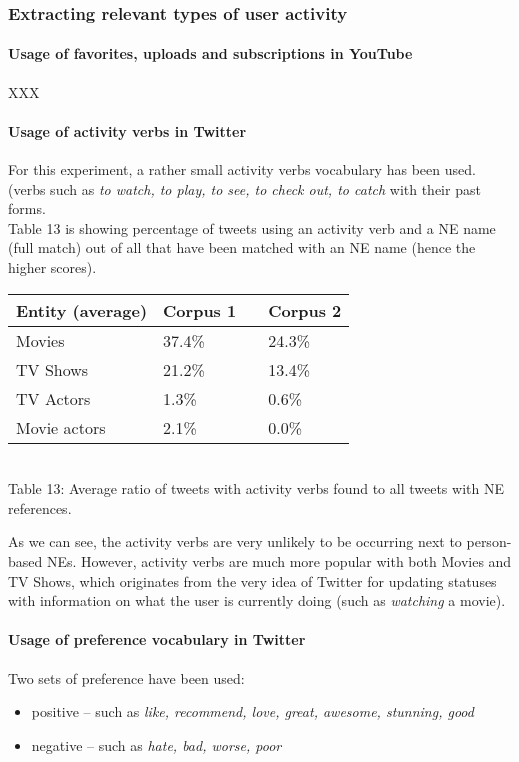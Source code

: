 \subsubsection{Extracting relevant types of user activity}

\paragraph{Usage of favorites, uploads and subscriptions in YouTube}

XXX

\paragraph{Usage of activity verbs in Twitter}
For this experiment, a rather small activity verbs vocabulary has been used. (verbs such
as \textit{to watch, to play, to see, to check out, to catch} with their past forms.
\\ Table 13 is showing percentage of tweets using an activity verb
and a NE name (full match) out of all that have been matched with an
NE name (hence the higher scores).

\begin{center}
  \begin{tabular}{ | p{4cm} | p{2cm} | p{1cm}| p{2cm} | } \hline
    Entity (average) & Corpus 1 & & Corpus 2 \\ \hline
    Movies & 37.4\% & & 24.3\% \\ \hline
    TV Shows & 21.2\% & & 13.4\% \\ \hline
    TV Actors & 1.3\% & & 0.6\% \\ \hline
    Movie actors & 2.1\% & & 0.0\% \\ \hline
  \end{tabular} \\
  Table 13: Average ratio of tweets with activity verbs found to all tweets with NE references. \\
\end{center}

As we can see, the activity verbs are very unlikely to be occurring next to
person-based NEs. However, activity verbs are much more popular with both
Movies and TV Shows, which originates from the very idea of Twitter for
updating statuses with information on what the user is currently doing (such as \textit{watching}
a movie).

\paragraph{Usage of preference vocabulary in Twitter}
Two sets of preference have been used:
\begin{itemize}
  \item positive -- such as \textit{like, recommend, love, great, awesome, stunning, good}
  \item negative -- such as \textit{hate, bad, worse, poor}
\end{itemize}


